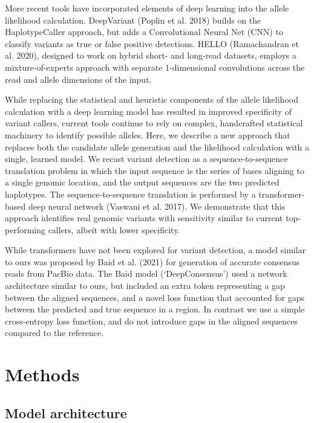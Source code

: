 \documentclass[]{article}
\begin{document}
More recent tools have incorporated elements of deep learning into the allele likelihood calculation. DeepVariant (Poplin et al. 2018) builds on the HaplotypeCaller approach, but adds a Convolutional Neural Net (CNN) to classify variants as true or false positive detections. HELLO (Ramachandran et al. 2020), designed to work on hybrid short- and long-read datasets, employs a mixture-of-experts approach with separate 1-dimensional convolutions across the read and allele dimensions of the input. 

While replacing the statistical and heuristic components of the allele likelihood calculation with a deep learning model has resulted in improved specificity of variant callers, current tools continue to rely on complex, handcrafted statistical machinery to identify possible alleles. Here, we describe a new approach that replaces both the candidate allele generation and the likelihood calculation with a single, learned model. We recast variant detection as a sequence-to-sequence translation problem in which the input sequence is the series of bases aligning to a single genomic location, and the output sequences are the two predicted haplotypes. The sequence-to-sequence translation is performed by a transformer-based deep neural network (Vaswani et al. 2017). We demonstrate that this approach identifies real genomic variants with sensitivity similar to current top-performing callers, albeit with lower specificity. 

While transformers have not been explored for variant detection, a model similar to ours was proposed by Baid et al. (2021) for generation of accurate consensus reads from PacBio data. The Baid model (`DeepConsensus') used a network architecture similar to ours, but included an extra token representing a gap between the aligned sequences, and a novel loss function that accounted for gaps between the predicted and true sequence in a region. In contrast we use a simple cross-entropy loss function, and do not introduce gaps in the aligned sequences compared to the reference. 

\section{Methods}

\subsection{Model architecture}
\end{document}
